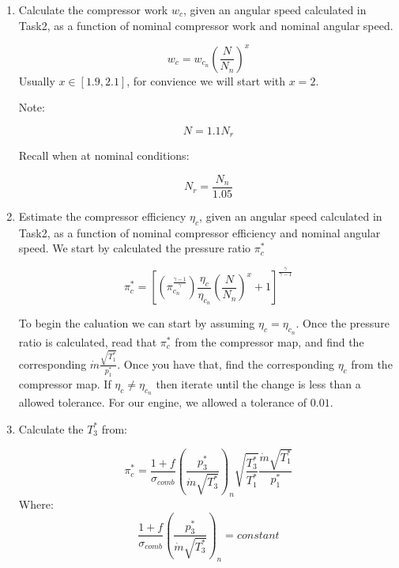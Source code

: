 \documentclass[12pt,english]{article}
\begin{document}
\begin{enumerate}
  \item Calculate the compressor work $w_{c}$, given an angular speed calculated
  in Task2, as a function of nominal compressor work and nominal angular speed.

  \begin{equation}
    w_{c} = w_{c_{n}} \left( \frac{N}{N_{n}} \right)^{x}
  \end{equation}
  Usually $x \in [1.9, 2.1]$, for convience we will start with $x = 2$.

  Note: 

  \begin{equation}
    N = 1.1N_{r}
  \end{equation}

  Recall when at nominal conditions:

  \begin{equation}
    N_{r} = \frac{N_{n}}{1.05}
  \end{equation}

  \item Estimate the compressor efficiency $\eta_{c}$, given an angular 
  speed calculated in Task2, as a function of nominal compressor efficiency and
  nominal angular speed. We start by calculated the pressure ratio $\pi_{c}^{*}$

  \begin{equation}
    \pi_{c}^{*} = \left[ \left(\pi_{c_{n}}^{\frac{\gamma-1}{\gamma}}\right)
    \frac{\eta_{c}}{\eta_{c_{n}}} \left(\frac{N}{N_{n}}\right)^{x} +1 \right]^{\frac{\gamma}{\gamma-1}}
  \end{equation}

  To begin the caluation we can start by assuming $\eta_{c} = \eta_{c_{n}}$. Once
  the pressure ratio is calculated, read that $\pi_{c}^{*}$ from the compressor map, 
  and find the corresponding $\dot{m}\frac{\sqrt{T_{1}^{*}}}{p_{1}^{*}}$. Once you have 
  that, find the corresponding $\eta_{c}$ from the compressor map. If $\eta_{c} \neq \eta_{c_{n}}$ 
  then iterate until the change is less than a allowed tolerance. For our engine,
  we allowed a tolerance of $0.01$.

  \item Calculate the $T_{3}^{*}$ from:
  
  \begin{equation}
    \pi_{c}^{*} = \frac{1+f}{\sigma_{comb}} \left( \frac{p_{3}^{*}}{\dot{m}\sqrt{T_{3}^{*}}} \right)_{n}
    \sqrt{\frac{T_{3}^{*}}{T_{1}^{*}}} \frac{\dot{m}\sqrt{T_{1}^{*}}}{p_{1}^{*}}
  \end{equation}
  Where:
  \begin{equation}
    \frac{1+f}{\sigma_{comb}} \left( \frac{p_{3}^{*}}{\dot{m}\sqrt{T_{3}^{*}}} \right)_{n} = constant
  \end{equation}
  

\end{enumerate}
\end{document}
